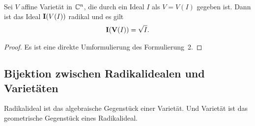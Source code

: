 \documentclass[11pt]{article}
\numberwithin{equation}{section}
\begin{document}
\begin{theorem}
	Sei $V$ affine Varietät in $\mathbb{C}^n$, die durch ein Ideal  $I$ als $V= V(I)$ gegeben ist. Dann ist das Ideal $\mathbf{I}(V(I))$ radikal und es gilt 
	\[
		\mathbf{I}(\mathbf{V}(I)) = \sqrt { I}. 
	\]
\end{theorem} 
\begin{proof}
	Es ist eine direkte Umformulierung des Formulierung~2.
\end{proof} 

\subsection{Bijektion zwischen Radikalidealen und Varietäten} 

Radikalideal ist das algebraische Gegenstück einer Varietät. Und Varietät ist das geometrische Gegenstück eines Radikalideal. 
\end{document}
